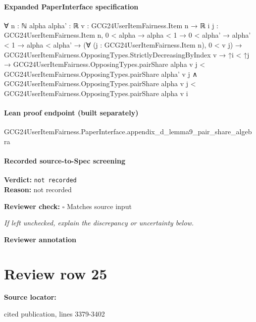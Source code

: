 \documentclass[10pt]{article}
\newcommand{\reviewerbox}{%
  \par\noindent\fbox{\parbox{0.96\linewidth}{\rule{0pt}{0.38in}}}\par
}
\newcommand{\reviewmatch}[1]{%
  \par\noindent\textbf{Reviewer check:} $\square$\; #1\par
  \noindent\emph{If left unchecked, explain the discrepancy or uncertainty below.}\par
}
\begin{document}
\paragraph{Expanded PaperInterface specification}
\begin{ReviewVerbatim}
∀ {n : ℕ} {alpha alpha' : ℝ} {v : GCG24UserItemFairness.Item n → ℝ} {i j : GCG24UserItemFairness.Item n},
  0 < alpha →
    alpha < 1 →
      0 < alpha' →
        alpha' < 1 →
          alpha < alpha' →
            (∀ (j : GCG24UserItemFairness.Item n), 0 < v j) →
              GCG24UserItemFairness.OpposingTypes.StrictlyDecreasingByIndex v →
                ↑i < ↑j →
                  GCG24UserItemFairness.OpposingTypes.pairShare alpha v j <
                      GCG24UserItemFairness.OpposingTypes.pairShare alpha' v j ∧
                    GCG24UserItemFairness.OpposingTypes.pairShare alpha v j <
                      GCG24UserItemFairness.OpposingTypes.pairShare alpha v i
\end{ReviewVerbatim}

\paragraph{Lean proof endpoint (built separately)}\begin{ReviewVerbatim}
GCG24UserItemFairness.PaperInterface.appendix_d_lemma9_pair_share_algebra
\end{ReviewVerbatim}

\paragraph{Recorded source-to-Spec screening}
\textbf{Verdict:} \texttt{not recorded}
\\
\textbf{Reason:} not recorded
\reviewmatch{Matches source input}
\noindent\textbf{Reviewer annotation}\par
\reviewerbox
\clearpage
\hypertarget{source-claim-e72b5fec2071cbe5}{}
\section*{Review row 25}
\textbf{Source locator:} {\footnotesize\raggedright cited publication, lines 3379-\allowbreak{}3402\par}
\end{document}
